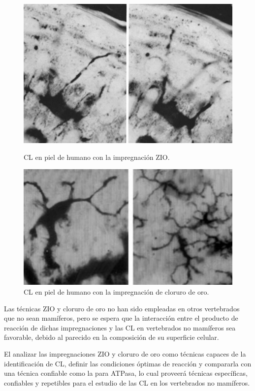 \begin{figure}[h]
    \begin{minipage}[b]{0.225\textwidth}
        \centering
        \includegraphics[scale=0.2325,frame]{ImpregancionZIO.jpg}
        \caption{\small{CL en piel de humano con la impregnación ZIO.}}
    \end{minipage}
    \hfill
    \begin{minipage}[b]{0.25\textwidth}
        \centering
        \includegraphics[scale=0.2725,frame]{ImpregancionAu.jpg}
        \caption{\small{CL en piel de humano con la impregnación de cloruro de oro.}}
    \end{minipage}
\end{figure}

Las técnicas ZIO y cloruro de oro no han sido empleadas en otros vertebrados que no sean mamíferos, pero se espera que la interacción entre el producto de reacción de dichas impregnaciones y las CL en vertebrados no mamíferos sea favorable, debido al parecido en la composición de su superficie celular.

El analizar las impregnaciones ZIO y cloruro de oro como técnicas capaces de la identificación de CL, definir las condiciones óptimas de reacción y  compararla con una técnica confiable como la  para ATPasa\cite{article:ATPasa}, lo cual proveerá técnicas específicas, confiables y repetibles para el estudio de las CL en los vertebrados no mamíferos.